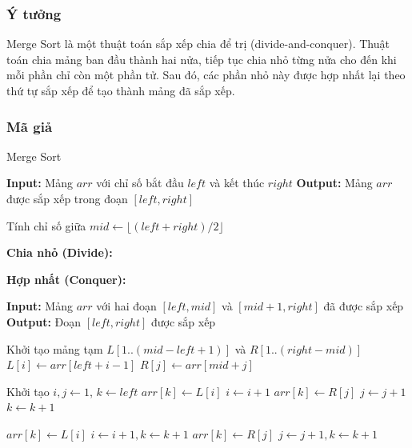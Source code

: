 \subsubsection{Ý tưởng}
Merge Sort là một thuật toán sắp xếp chia để trị (divide-and-conquer). Thuật toán chia mảng ban đầu thành hai nửa, tiếp tục chia nhỏ từng nửa cho đến khi mỗi phần chỉ còn một phần tử. Sau đó, các phần nhỏ này được hợp nhất lại theo thứ tự sắp xếp để tạo thành mảng đã sắp xếp.

\subsubsection{Mã giả}

\begin{algorithm}[H]
\caption{Merge Sort}
\begin{algorithmic}[1]
    \State \textbf{Input:} Mảng $arr$ với chỉ số bắt đầu $left$ và kết thúc $right$
    \State \textbf{Output:} Mảng $arr$ được sắp xếp trong đoạn $[left, right]$
    
        \State Tính chỉ số giữa $mid \gets \lfloor (left + right) / 2 \rfloor$
        
        \State \textbf{Chia nhỏ (Divide):}
        \State {} 
        \State {} 
        
        \State \textbf{Hợp nhất (Conquer):}
        \State {} 
    \EndIf
\EndProcedure

    \State \textbf{Input:} Mảng $arr$ với hai đoạn $[left, mid]$ và $[mid+1, right]$ đã được sắp xếp
    \State \textbf{Output:} Đoạn $[left, right]$ được sắp xếp
    
    \State Khởi tạo mảng tạm $L[1..(mid-left+1)]$ và $R[1..(right-mid)]$
        \State $L[i] \gets arr[left + i - 1]$
    \EndFor
        \State $R[j] \gets arr[mid + j]$
    \EndFor
    
    \State Khởi tạo $i, j \gets 1$, $k \gets left$
            \State $arr[k] \gets L[i]$
            \State $i \gets i + 1$
        \Else
            \State $arr[k] \gets R[j]$
            \State $j \gets j + 1$
        \EndIf
        \State $k \gets k + 1$
    \EndWhile
    
        \State $arr[k] \gets L[i]$
        \State $i \gets i + 1, k \gets k + 1$
    \EndWhile
        \State $arr[k] \gets R[j]$
        \State $j \gets j + 1, k \gets k + 1$
    \EndWhile
\EndProcedure
\end{algorithmic}
\end{algorithm}

